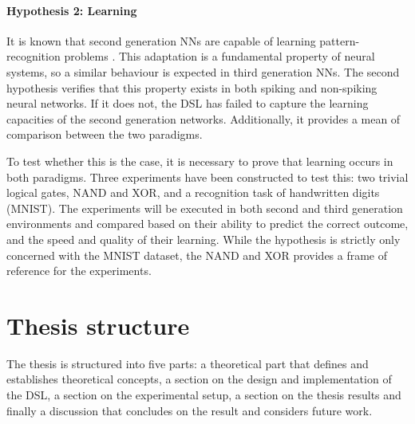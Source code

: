 \paragraph{Hypothesis 2: Learning}
It is known that second generation \gls{NN}s are capable of learning
pattern-recognition problems \cite{Russel2007}.
This adaptation is a fundamental property of neural systems, so a
similar behaviour is expected in third generation \gls{NN}s.
The second hypothesis verifies that this property exists in both spiking and
non-spiking neural networks.
If it does not, the \gls{DSL} has failed to capture
the learning capacities of the second generation networks.
Additionally, it provides a mean of comparison between the two paradigms.

To test whether this is the case, it is necessary to prove that learning occurs
in both paradigms.
Three experiments have been constructed to test this: two trivial
logical gates, NAND and XOR, and a recognition task of handwritten digits
(MNIST).
The experiments will be executed in both second and third generation
environments and compared based on their ability to predict the correct outcome,
and the speed and quality of their learning.
While the hypothesis is strictly only concerned with the MNIST dataset, the NAND
and XOR provides a frame of reference for the experiments.

\section{Thesis structure}
The thesis is structured into five parts:
a theoretical part that defines and establishes theoretical concepts,
a section on the design and implementation of the \gls{DSL}, a section on the
experimental setup, a section on the thesis results and finally a discussion
that concludes on the result and considers future work.



